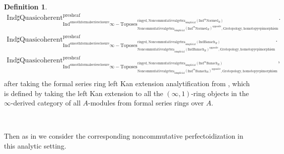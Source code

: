 \documentclass[11pt]{book}
\theoremstyle{definition}
\newtheorem{definition}[theorem]{Definition}
\numberwithin{equation}{section}
\begin{document}
\begin{definition}
\begin{align}
\mathrm{Ind}\mathrm{\sharp Quasicoherent}^{\text{presheaf}}_{\mathrm{Ind}^\text{smoothformalseriesclosure}\infty-\mathrm{Toposes}^{\mathrm{ringed},\mathrm{Noncommutativealgebra}_{\mathrm{simplicial}}(\mathrm{Ind}^m\mathrm{Normed}_R)}_{\mathrm{Noncommutativealgebra}_{\mathrm{simplicial}}(\mathrm{Ind}^m\mathrm{Normed}_R)^\mathrm{opposite},\mathrm{Grotopology,homotopyepimorphism}}}.\\
\mathrm{Ind}\mathrm{\sharp Quasicoherent}^{\text{presheaf}}_{\mathrm{Ind}^\text{smoothformalseriesclosure}\infty-\mathrm{Toposes}^{\mathrm{ringed},\mathrm{Noncommutativealgebra}_{\mathrm{simplicial}}(\mathrm{Ind}\mathrm{Banach}_R)}_{\mathrm{Noncommutativealgebra}_{\mathrm{simplicial}}(\mathrm{Ind}\mathrm{Banach}_R)^\mathrm{opposite},\mathrm{Grotopology,homotopyepimorphism}}}.\\
\mathrm{Ind}\mathrm{\sharp Quasicoherent}^{\text{presheaf}}_{\mathrm{Ind}^\text{smoothformalseriesclosure}\infty-\mathrm{Toposes}^{\mathrm{ringed},\mathrm{Noncommutativealgebra}_{\mathrm{simplicial}}(\mathrm{Ind}^m\mathrm{Banach}_R)}_{\mathrm{Noncommutativealgebra}_{\mathrm{simplicial}}(\mathrm{Ind}^m\mathrm{Banach}_R)^\mathrm{opposite},\mathrm{Grotopology,homotopyepimorphism}}},\\ 
\end{align}
after taking the formal series ring left Kan extension analytification from \cite[Section 4.2]{BBM}, which is defined by taking the left Kan extension to all the $(\infty,1)$-ring objects in the $\infty$-derived category of all $A$-modules from formal series rings over $A$.\\
\end{definition}

\

\indent Then as in \cite[Definition 8.2]{12BS} we consider the corresponding noncommutative perfectoidization in this analytic setting. 
\end{document}
